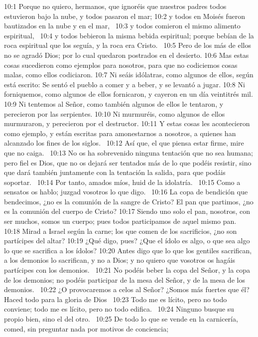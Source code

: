 10:1 Porque no quiero, hermanos, que ignoréis que nuestros padres todos estuvieron bajo la nube, y todos pasaron el mar; 
10:2 y todos en Moisés fueron bautizados en la nube y en el mar,  
10:3 y todos comieron el mismo alimento espiritual,  
10:4 y todos bebieron la misma bebida espiritual; porque bebían de la roca espiritual que los seguía, y la roca era Cristo.  
10:5 Pero de los más de ellos no se agradó Dios; por lo cual quedaron postrados en el desierto. 
10:6 Mas estas cosas sucedieron como ejemplos para nosotros, para que no codiciemos cosas malas, como ellos codiciaron. 
10:7 Ni seáis idólatras, como algunos de ellos, según está escrito: Se sentó el pueblo a comer y a beber, y se levantó a jugar. 
10:8 Ni forniquemos, como algunos de ellos fornicaron, y cayeron en un día veintitrés mil. 
10:9 Ni tentemos al Señor, como también algunos de ellos le tentaron, y perecieron por las serpientes. 
10:10 Ni murmuréis, como algunos de ellos murmuraron, y perecieron por el destructor. 
10:11 Y estas cosas les acontecieron como ejemplo, y están escritas para amonestarnos a nosotros, a quienes han alcanzado los fines de los siglos.  
10:12 Así que, el que piensa estar firme, mire que no caiga.  
10:13 No os ha sobrevenido ninguna tentación que no sea humana; pero fiel es Dios, que no os dejará ser tentados más de lo que podéis resistir, sino que dará también juntamente con la tentación la salida, para que podáis soportar.  
10:14 Por tanto, amados míos, huid de la idolatría.  
10:15 Como a sensatos os hablo; juzgad vosotros lo que digo.  
10:16 La copa de bendición que bendecimos, ¿no es la comunión de la sangre de Cristo? El pan que partimos, ¿no es la comunión del cuerpo de Cristo? 
10:17 Siendo uno solo el pan, nosotros, con ser muchos, somos un cuerpo; pues todos participamos de aquel mismo pan.  
10:18 Mirad a Israel según la carne; los que comen de los sacrificios, ¿no son partícipes del altar? 
10:19 ¿Qué digo, pues? ¿Que el ídolo es algo, o que sea algo lo que se sacrifica a los ídolos? 
10:20 Antes digo que lo que los gentiles sacrifican, a los demonios lo sacrifican, y no a Dios; y no quiero que vosotros os hagáis partícipes con los demonios.  
10:21 No podéis beber la copa del Señor, y la copa de los demonios; no podéis participar de la mesa del Señor, y de la mesa de los demonios.  
10:22 ¿O provocaremos a celos al Señor? ¿Somos más fuertes que él?  
Haced todo para la gloria de Dios  
10:23 Todo me es lícito, pero no todo conviene; todo me es lícito, pero no todo edifica.  
10:24 Ninguno busque su propio bien, sino el del otro.  
10:25 De todo lo que se vende en la carnicería, comed, sin preguntar nada por motivos de conciencia;  
